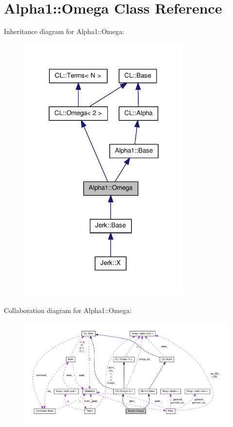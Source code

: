 \hypertarget{classAlpha1_1_1Omega}{\section{\-Alpha1\-:\-:\-Omega \-Class \-Reference}
\label{classAlpha1_1_1Omega}
}


\-Inheritance diagram for \-Alpha1\-:\-:\-Omega\-:\nopagebreak
\begin{figure}[H]
\begin{center}
\leavevmode
\includegraphics[width=248pt]{classAlpha1_1_1Omega__inherit__graph}
\end{center}
\end{figure}


\-Collaboration diagram for \-Alpha1\-:\-:\-Omega\-:\nopagebreak
\begin{figure}[H]
\begin{center}
\leavevmode
\includegraphics[width=350pt]{classAlpha1_1_1Omega__coll__graph}
\end{center}
\end{figure}
